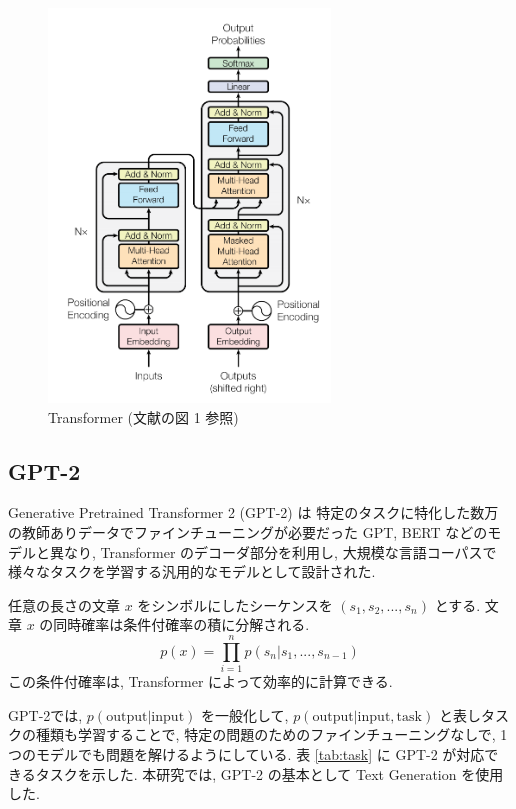 \documentclass[twocolumn]{jarticle}     %
\begin{document}
\begin{figure}[tb]
  \begin{center}
    \includegraphics[clip,width=75mm]{Transformer.png}
    \caption{Transformer (文献\cite{DBLP:journals/corr/VaswaniSPUJGKP17}の図 1 参照)}
    \label{fig:trans}
  \end{center}
\end{figure}



\subsection{GPT-2}
Generative Pretrained Transformer 2 (GPT-2) \cite{radford2019language} は
特定のタスクに特化した数万の教師ありデータでファインチューニングが必要だった GPT, BERT  \cite{devlin2018bert} などのモデルと異なり,
Transformer のデコーダ部分を利用し,
大規模な言語コーパスで様々なタスクを学習する汎用的なモデルとして設計された.

任意の長さの文章 $x$ をシンボルにしたシーケンスを $(s_1, s_2, ..., s_n)$ とする.
文章 $x$ の同時確率は条件付確率の積に分解される.
\begin{equation}
p(x) = \prod^n_{i=1} p(s_n|s_1, ... , s_{n-1})
\end{equation}
この条件付確率は, Transformer によって効率的に計算できる.

GPT-2では, $p(\mathrm{output} | \mathrm{input})$ を一般化して,
$p(\mathrm{output} | \mathrm{input}, \mathrm{task})$ と表しタスクの種類も学習することで, 特定の問題のためのファインチューニングなしで, 1 つのモデルでも問題を解けるようにしている.
表 \ref{tab:task} に GPT-2 が対応できるタスクを示した.
本研究では, GPT-2 の基本として Text Generation を使用した.
\end{document}
